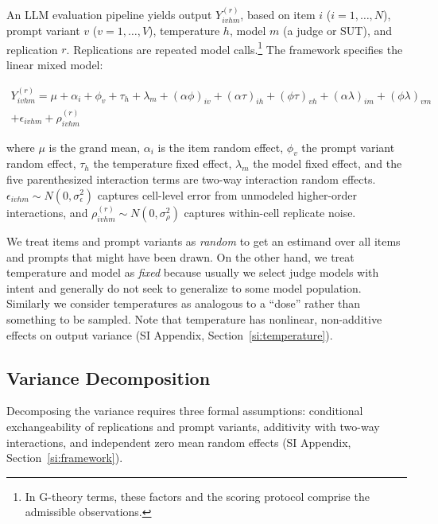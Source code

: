 \documentclass{article}
\begin{document}
An LLM evaluation pipeline yields output $Y_{ivhm}^{(r)}$, based on item $i$ ($i = 1, \ldots, N$), prompt variant $v$ ($v = 1, \ldots, V$), temperature $h$, model $m$ (a judge or SUT), and replication $r$. Replications are repeated model calls.\footnote{In G-theory terms, these factors and the scoring protocol comprise the admissible observations.} The framework specifies the linear mixed model:

\begin{equation}
\label{eq:dgp}
\begin{split}
Y_{ivhm}^{(r)} = \mu + \alpha_i + \phi_v + \tau_h + \lambda_m 
 + (\alpha\phi)_{iv} + (\alpha\tau)_{ih} + (\phi\tau)_{vh} 
 + (\alpha\lambda)_{im} + (\phi\lambda)_{vm} \\
 + \epsilon_{ivhm} + \rho_{ivhm}^{(r)}
\end{split}
\end{equation}

where $\mu$ is the grand mean, $\alpha_i$ is the item random effect, $\phi_v$ the prompt variant random effect, $\tau_h$ the temperature fixed effect, $\lambda_m$ the model fixed effect, and the five parenthesized interaction terms are two-way interaction random effects. $\epsilon_{ivhm} \sim N(0, \sigma^2_\epsilon)$ captures cell-level error from unmodeled higher-order interactions, and $\rho_{ivhm}^{(r)} \sim N(0, \sigma^2_\rho)$ captures within-cell replicate noise. %

We treat items and prompt variants as \emph{random} to get an estimand over all items and prompts that might have been drawn. On the other hand, we treat temperature and model as \emph{fixed} because usually we select judge models with intent and generally do not seek to generalize to some model population. Similarly we consider temperatures as analogous to a ``dose'' rather than something to be sampled. Note that temperature has nonlinear, non-additive effects on output variance \citep{renze2024temperature, li2025hotcold} (SI Appendix, Section~\ref{si:temperature}). %

\subsection{Variance Decomposition}
\label{sec:gstudy}

Decomposing the variance requires three formal assumptions: conditional exchangeability of replications and prompt variants, additivity with two-way interactions, and independent zero mean random effects (SI Appendix, Section~\ref{si:framework}). %
\end{document}

